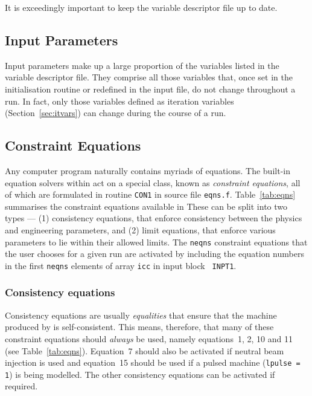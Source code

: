 It is exceedingly important to keep the variable descriptor file up to date.

\subsection{Input Parameters}
\label{sec:inpars}

Input parameters make up a large proportion of the variables listed in the
variable descriptor file. They comprise all those variables that, once set in
the initialisation routine or redefined in the input file, do not change
throughout a \PS run. In fact, only those variables defined as iteration
variables (Section~\ref{sec:itvars}) can change during the course of a run.

\subsection{Constraint Equations}
\label{sec:constraints}

Any computer program naturally contains myriads of equations. The built-in
equation solvers within \PS act on a special class, known as {\em constraint
equations}, all of which are formulated in routine {\tt CON1} in source file
{\tt eqns.f}. Table~\ref{tab:eqns} summarises the constraint equations
available in \PSD These can be split into two types --- (1) consistency
equations, that enforce consistency between the physics and engineering
parameters, and (2) limit equations, that enforce various parameters to lie
within their allowed limits. The {\tt neqns} constraint equations that the
user chooses for a given run are activated by including the equation numbers
in the first {\tt neqns} elements of array {\tt icc} in input block {\tt
INPT1}.

\subsubsection{Consistency equations}

Consistency equations are usually {\em equalities}\/ that ensure that the
machine produced by \PS is self-consistent. This means, therefore, that many
of these constraint equations should {\em always}\/ be used, namely
equations~1, 2, 10 and 11 (see Table~\ref{tab:eqns}).  Equation~7 should also
be activated if neutral beam injection is used and equation~15 should be used
if a pulsed machine ({\tt lpulse = 1}) is being modelled.  The other
consistency equations can be activated if required.

